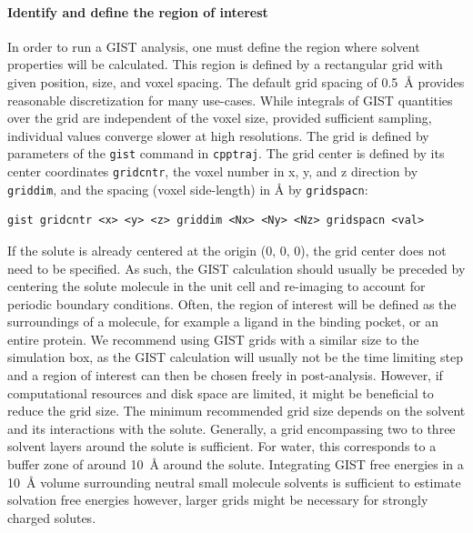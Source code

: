 \documentclass[9pt,tutorial,pubversion]{livecoms}
\newcommand{\software}{\texttt}
\newcommand\inlinecode{\texttt}
\begin{document}
\paragraph{Identify and define the region of interest}
In order to run a GIST analysis, one must define the region where solvent properties will be calculated.
This region is defined by a rectangular grid with given position, size, and voxel spacing.
The default grid spacing of \qty{0.5}{\angstrom} provides reasonable discretization for many use-cases.
While integrals of GIST quantities over the grid are independent of the voxel size, provided sufficient sampling, individual values converge slower at high resolutions.
The grid is defined by parameters of the \inlinecode{gist} command in \software{cpptraj}.
The grid center is defined by its center coordinates \inlinecode{gridcntr}, the voxel number in x, y, and z direction by \inlinecode{griddim}, and the spacing (voxel side-length) in \AA{} by \inlinecode{gridspacn}:

\begin{lstlisting}[style=cpptraj]
gist gridcntr <x> <y> <z> griddim <Nx> <Ny> <Nz> gridspacn <val>
\end{lstlisting}

If the solute is already centered at the origin (0, 0, 0), the grid center does not need to be specified.
As such, the GIST calculation should usually be preceded by centering the solute molecule in the unit cell and re-imaging to account for periodic boundary conditions.
Often, the region of interest will be defined as the surroundings of a molecule, for example a ligand in the binding pocket, or an entire protein.
We recommend using GIST grids with a similar size to the simulation box, as the GIST calculation will usually not be the time limiting step and a region of interest can then be chosen freely in post-analysis.
However, if computational resources and disk space are limited, it might be beneficial to reduce the grid size.
The minimum recommended grid size depends on the solvent and its interactions with the solute.
Generally, a grid encompassing two to three solvent layers around the solute is sufficient. 
For water, this corresponds to a buffer zone of around \qty{10}{\angstrom} around the solute. 
Integrating GIST free energies in a \qty{10}{\angstrom} volume surrounding neutral small molecule solvents is sufficient to estimate solvation free energies \cite{Chen2021,Waibl2022-gist-solvents} however, larger grids might be necessary for strongly charged solutes.
\end{document}
